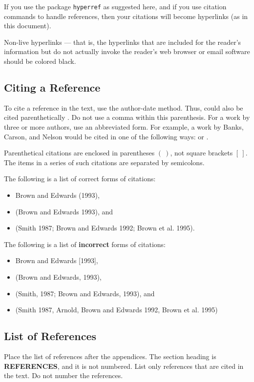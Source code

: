 \documentclass{wscpaperproc}
\theoremstyle{wsc}
\begin{document}
If you use the package {\tt hyperref} as suggested here, and if you use citation commands to handle references, then your citations will
become hyperlinks (as in this document).

Non-live hyperlinks --- that is, the hyperlinks that are included for the reader's information but do not actually invoke the reader's web browser or email software should be colored black.

\subsection{Citing a Reference}
To cite a reference in the text, use the author-date method. Thus,  could also be cited parenthetically \cite{chi89}.
Do not use a comma within this parenthesis. 
For a work by three or more authors, use an abbreviated form. For example, a work by Banks, Carson, and Nelson would be cited in one of the following ways:  or .

Parenthetical citations are enclosed in parentheses $(~)$, not square brackets $[~]$.
The items in a series of such citations are separated by semicolons.

The following is a list of correct forms of citations:
\begin{itemize}
\item Brown and Edwards (1993),
\item (Brown and Edwards 1993), and
\item (Smith 1987; Brown and Edwards 1992; Brown et al. 1995).
\end{itemize}

The following is a list of \textbf{incorrect} forms of citations:
\begin{itemize}
\item Brown and Edwards [1993],
\item (Brown and Edwards, 1993),
\item (Smith, 1987; Brown and Edwards, 1993), and
\item (Smith 1987, Arnold, Brown and Edwards 1992, Brown et al. 1995)
\end{itemize}

\subsection{List of References}
Place the list of references after the appendices. The section heading is {\bf REFERENCES}, and it is not numbered. List only references that are cited in the text. Do not number the references.
\end{document}
